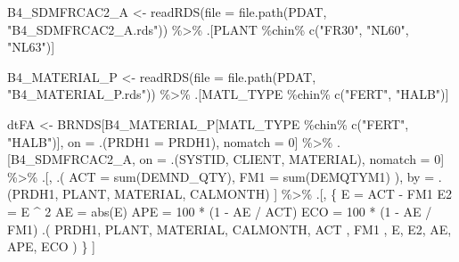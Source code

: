 \documentclass[
  american,
  10,
  a4paper,
]{book}
\newenvironment{Shaded}{\begin{snugshade}}{\end{snugshade}}
\newcommand{\AttributeTok}[1]{\textcolor[rgb]{0.40,0.45,0.13}{#1}}
\newcommand{\DecValTok}[1]{\textcolor[rgb]{0.68,0.00,0.00}{#1}}
\newcommand{\FunctionTok}[1]{\textcolor[rgb]{0.28,0.35,0.67}{#1}}
\newcommand{\NormalTok}[1]{\textcolor[rgb]{0.00,0.23,0.31}{#1}}
\newcommand{\OtherTok}[1]{\textcolor[rgb]{0.00,0.23,0.31}{#1}}
\newcommand{\SpecialCharTok}[1]{\textcolor[rgb]{0.37,0.37,0.37}{#1}}
\newcommand{\StringTok}[1]{\textcolor[rgb]{0.13,0.47,0.30}{#1}}
\theoremstyle{definition}
\theoremstyle{remark}
\begin{document}
\begin{Shaded}
\begin{Highlighting}[]
\NormalTok{B4\_SDMFRCAC2\_A }\OtherTok{\textless{}{-}} 
  \FunctionTok{readRDS}\NormalTok{(}\AttributeTok{file =} \FunctionTok{file.path}\NormalTok{(PDAT, }\StringTok{"B4\_SDMFRCAC2\_A.rds"}\NormalTok{))              }\SpecialCharTok{\%\textgreater{}\%}
\NormalTok{  .[PLANT }\SpecialCharTok{\%chin\%} \FunctionTok{c}\NormalTok{(}\StringTok{"FR30"}\NormalTok{, }\StringTok{"NL60"}\NormalTok{, }\StringTok{"NL63"}\NormalTok{)]}

\NormalTok{B4\_MATERIAL\_P  }\OtherTok{\textless{}{-}} 
  \FunctionTok{readRDS}\NormalTok{(}\AttributeTok{file =} \FunctionTok{file.path}\NormalTok{(PDAT, }\StringTok{"B4\_MATERIAL\_P.rds"}\NormalTok{))               }\SpecialCharTok{\%\textgreater{}\%}
\NormalTok{  .[MATL\_TYPE }\SpecialCharTok{\%chin\%} \FunctionTok{c}\NormalTok{(}\StringTok{"FERT"}\NormalTok{, }\StringTok{"HALB"}\NormalTok{)]}

\NormalTok{dtFA }\OtherTok{\textless{}{-}} 
\NormalTok{  BRNDS[B4\_MATERIAL\_P[MATL\_TYPE }\SpecialCharTok{\%chin\%} \FunctionTok{c}\NormalTok{(}\StringTok{"FERT"}\NormalTok{, }\StringTok{"HALB"}\NormalTok{)], }
\NormalTok{        on }\OtherTok{=}\NormalTok{ .(}\AttributeTok{PRDH1 =}\NormalTok{ PRDH1), nomatch }\OtherTok{=} \DecValTok{0}\NormalTok{]                          }\SpecialCharTok{\%\textgreater{}\%}
\NormalTok{  .[B4\_SDMFRCAC2\_A, on }\OtherTok{=}\NormalTok{ .(SYSTID, CLIENT, MATERIAL), nomatch }\OtherTok{=} \DecValTok{0}\NormalTok{]   }\SpecialCharTok{\%\textgreater{}\%}
\NormalTok{  .[, .(}
    \AttributeTok{ACT =} \FunctionTok{sum}\NormalTok{(DEMND\_QTY),}
    \AttributeTok{FM1 =} \FunctionTok{sum}\NormalTok{(DEMQTYM1)}
\NormalTok{  ), by }\OtherTok{=}\NormalTok{ .(PRDH1, PLANT, MATERIAL, CALMONTH)}
\NormalTok{  ]                                                                  }\SpecialCharTok{\%\textgreater{}\%}
\NormalTok{  .[, \{}
\NormalTok{    E   }\OtherTok{=}\NormalTok{ ACT }\SpecialCharTok{{-}}\NormalTok{ FM1}
\NormalTok{    E2  }\OtherTok{=}\NormalTok{ E }\SpecialCharTok{\^{}} \DecValTok{2}
\NormalTok{    AE  }\OtherTok{=} \FunctionTok{abs}\NormalTok{(E)}
\NormalTok{    APE }\OtherTok{=} \DecValTok{100} \SpecialCharTok{*}\NormalTok{ (}\DecValTok{1} \SpecialCharTok{{-}}\NormalTok{ AE }\SpecialCharTok{/}\NormalTok{ ACT)}
\NormalTok{    ECO }\OtherTok{=} \DecValTok{100} \SpecialCharTok{*}\NormalTok{ (}\DecValTok{1} \SpecialCharTok{{-}}\NormalTok{ AE }\SpecialCharTok{/}\NormalTok{ FM1)}
\NormalTok{    .(}
\NormalTok{      PRDH1, PLANT, MATERIAL, CALMONTH, }
\NormalTok{      ACT  , FM1  , E, E2, AE, APE, ECO}
\NormalTok{      )}
\NormalTok{  \}  ] }


\end{Highlighting}
\end{Shaded}
\end{document}
